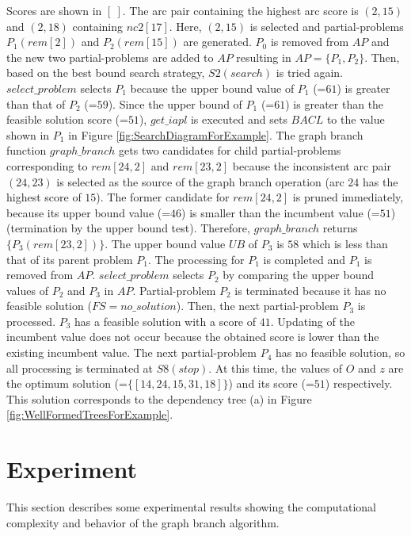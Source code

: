 Scores are shown in $[\ ]$. The arc pair containing the highest arc
score is $(2,15)$ and $(2,18)$ containing $nc2[17]$. Here, $(2,15)$ is
selected and partial-problems $P_1(rem[2])$ and $P_2(rem[15])$ are
generated. $P_0$ is removed from $AP$ and the new two partial-problems
are added to $AP$ resulting in $AP=\{P_1,P_2\}$. Then, based on the
best bound search strategy, $S2(search)$ is tried
again. $select\_problem$ selects $P_1$ because the upper bound value of
$P_1$ (=$61$) is greater than that of $P_2$ (=$59$). Since the upper
bound of $P_1$ (=$61$) is greater than the feasible solution score
(=$51$), $get\_iapl$ is executed and sets $BACL$ to the value shown in
$P_1$ in Figure \ref{fig:SearchDiagramForExample}. The graph branch function
$graph\_branch$ gets two candidates for child partial-problems
corresponding to $rem[24,2]$ and $rem[23,2]$ because the inconsistent
arc pair $(24,23)$ is selected as the source of the graph branch
operation (arc $24$ has the highest score of $15$). The former
candidate for $rem[24,2]$ is pruned immediately, because its upper bound
value (=$46$) is smaller than the incumbent value (=$51$) (termination
by the upper bound test). Therefore, $graph\_branch$ returns
$\{P_3(rem[23,2])\}$. The upper bound value $UB$ of $P_3$ is $58$
which is less than that of its parent problem $P_1$. The processing
for $P_1$ is completed and $P_1$ is removed from
$AP$. $select\_problem$ selects $P_2$ by comparing the upper bound
values of $P_2$ and $P_3$ in $AP$. Partial-problem $P_2$ is terminated
because it has no feasible solution ($FS=no\_solution$). Then, the next
partial-problem $P_3$ is processed. $P_3$ has a feasible solution with
a score of $41$. Updating of the incumbent value does not occur because the
obtained score is lower than the existing incumbent value. The next
partial-problem $P_4$ has no feasible solution, so all processing is
terminated at $S8(stop)$. At this time, the values of $O$ and $z$ are the
optimum solution (=$\{[14,24,15,31,18]\}$) and its score (=$51$)
respectively. This solution corresponds to the dependency tree (a) in
Figure \ref{fig:WellFormedTreesForExample}.




\section{Experiment}
\label{sec:ExperimentOfOptSearch}

This section describes some experimental results showing the
computational complexity and behavior of the graph branch algorithm. 

